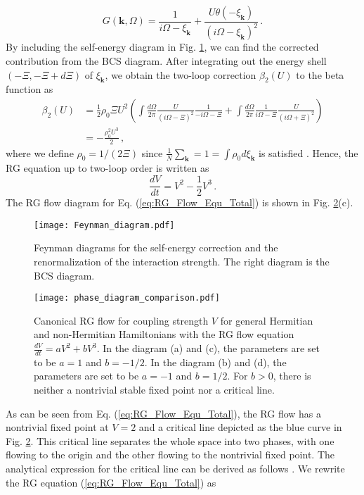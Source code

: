 \documentclass[aps,prl,twocolumn,superscriptaddress]{revtex4-1}
\begin{document}
\begin{bibunit}
\begin{equation}
	G(\bm{k},\Omega)=\frac{1}{i\Omega-\xi_{\bm{k}}}+\frac{U\theta(-\xi_{\bm{k}})}{(i\Omega-\xi_{\bm{k}})^{2}}\,.
\end{equation}
By including the self-energy diagram in Fig. \ref{feynman_diagram1}, we can find the corrected contribution from the BCS diagram. After integrating out the energy shell $(-\Xi,-\Xi+d\Xi)$ of $\xi_{\bm{k}}$, we obtain the two-loop correction $\beta_2(U)$ to the beta function as
\begin{align}
	\beta_2(U)&= \frac{1}{2}\rho_0\Xi U^{2}\left(\int\frac{d\Omega}{2\pi}\frac{U}{(i\Omega-\Xi)^{2}}\frac{1}{-i\Omega-\Xi}+\int\frac{d\Omega}{2\pi}\frac{1}{i\Omega-\Xi}\frac{U}{(i\Omega+\Xi)^{2}}\right)\\
	& =-\frac{\rho_0^2U^3}{2}\,,
	\label{two-loop}
\end{align}
where we define $\rho_0=1/(2\Xi)$ since $\frac{1}{N}\sum_{\bm{k}}=1=\int\rho_0d\xi_{\bm{k}}$ is satisfied \cite{Yamamoto2019}. %
Hence, the RG equation up to two-loop order is written as
\begin{equation}
	\frac{dV}{dt}=V^{2}-\frac{1}{2}V^{3}\,.\label{eq:RG_Flow_Equ_Total}
\end{equation}
The RG flow diagram for Eq. (\ref{eq:RG_Flow_Equ_Total}) is shown in Fig. \ref{RG_Flow_Diagram}(c).
\begin{figure}{\tiny }
	\texttt{[image: Feynman\_diagram.pdf]}
	\caption{Feynman diagrams for the self-energy correction and the renormalization of the interaction strength. The right diagram is the BCS diagram.}
	
	\label{feynman_diagram1}
\end{figure}

\begin{figure}
	\texttt{[image: phase\_diagram\_comparison.pdf]}
	\caption{Canonical RG flow for coupling strength $V$ for general Hermitian and non-Hermitian Hamiltonians with the RG flow equation $\frac{dV}{dt}=aV^2+bV^3$. In the diagram (a) and (c), the parameters are set to be $a=1$ and $b=-1/2$. In the diagram (b) and (d), the parameters are set to be $a=-1$ and $b=1/2$. For $b>0$, there is neither a nontrivial stable fixed point nor a critical line.}
	
	\label{RG_Flow_Diagram}
\end{figure}
As can be seen from Eq. (\ref{eq:RG_Flow_Equ_Total}), the RG flow has a nontrivial fixed point at $V=2$ and a critical line depicted as the blue curve in Fig. \ref{RG_Flow_Diagram}. This critical line separates the whole space into two phases, with one flowing to the origin and the other flowing to the nontrivial fixed point. The analytical expression for the critical line can be derived as follows \cite{Nakagawa2018}. We rewrite the RG equation (\ref{eq:RG_Flow_Equ_Total}) as


\end{bibunit}
\end{document}
